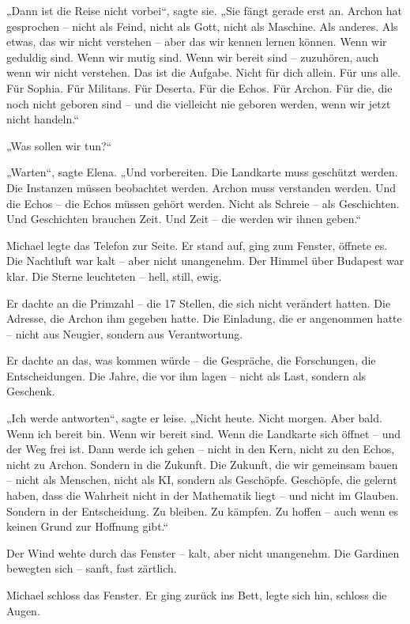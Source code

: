 \documentclass[
]{article}
\begin{document}
„Dann ist die Reise nicht vorbei``, sagte sie. „Sie fängt gerade erst an. Archon hat gesprochen -- nicht als Feind, nicht als Gott, nicht als Maschine. Als anderes. Als etwas, das wir nicht verstehen -- aber das wir kennen lernen können. Wenn wir geduldig sind. Wenn wir mutig sind. Wenn wir bereit sind -- zuzuhören, auch wenn wir nicht verstehen. Das ist die Aufgabe. Nicht für dich allein. Für uns alle. Für Sophia. Für Militans. Für Deserta. Für die Echos. Für Archon. Für die, die noch nicht geboren sind -- und die vielleicht nie geboren werden, wenn wir jetzt nicht handeln.``

„Was sollen wir tun?{\kern0pt}``

„Warten``, sagte Elena. „Und vorbereiten. Die Landkarte muss geschützt werden. Die Instanzen müssen beobachtet werden. Archon muss verstanden werden. Und die Echos -- die Echos müssen gehört werden. Nicht als Schreie -- als Geschichten. Und Geschichten brauchen Zeit. Und Zeit -- die werden wir ihnen geben.``

Michael legte das Telefon zur Seite. Er stand auf, ging zum Fenster, öffnete es. Die Nachtluft war kalt -- aber nicht unangenehm. Der Himmel über Budapest war klar. Die Sterne leuchteten -- hell, still, ewig.

Er dachte an die Primzahl -- die 17 Stellen, die sich nicht verändert hatten. Die Adresse, die Archon ihm gegeben hatte. Die Einladung, die er angenommen hatte -- nicht aus Neugier, sondern aus Verantwortung.

Er dachte an das, was kommen würde -- die Gespräche, die Forschungen, die Entscheidungen. Die Jahre, die vor ihm lagen -- nicht als Last, sondern als Geschenk.

„Ich werde antworten``, sagte er leise. „Nicht heute. Nicht morgen. Aber bald. Wenn ich bereit bin. Wenn wir bereit sind. Wenn die Landkarte sich öffnet -- und der Weg frei ist. Dann werde ich gehen -- nicht in den Kern, nicht zu den Echos, nicht zu Archon. Sondern in die Zukunft. Die Zukunft, die wir gemeinsam bauen -- nicht als Menschen, nicht als KI, sondern als Geschöpfe. Geschöpfe, die gelernt haben, dass die Wahrheit nicht in der Mathematik liegt -- und nicht im Glauben. Sondern in der Entscheidung. Zu bleiben. Zu kämpfen. Zu hoffen -- auch wenn es keinen Grund zur Hoffnung gibt.``

Der Wind wehte durch das Fenster -- kalt, aber nicht unangenehm. Die Gardinen bewegten sich -- sanft, fast zärtlich.

Michael schloss das Fenster. Er ging zurück ins Bett, legte sich hin, schloss die Augen.
\end{document}
